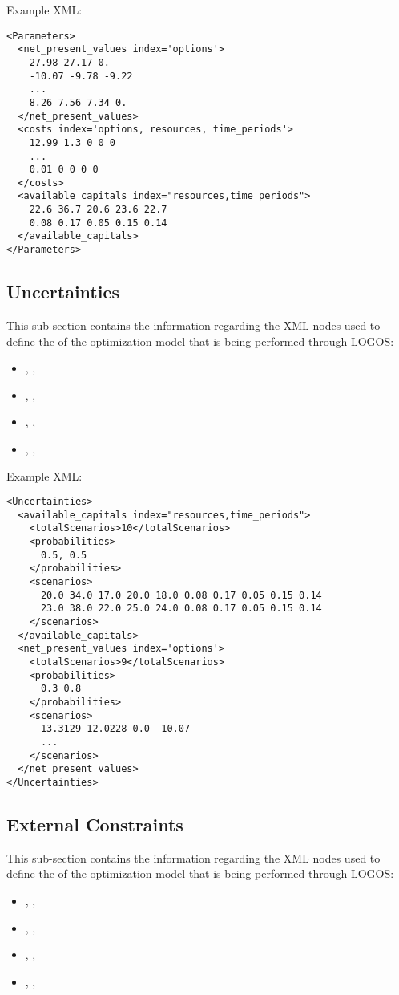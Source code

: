 Example XML:
\begin{lstlisting}[style=XML]
<Parameters>
  <net_present_values index='options'>
    27.98 27.17 0.
    -10.07 -9.78 -9.22
    ...
    8.26 7.56 7.34 0.
  </net_present_values>
  <costs index='options, resources, time_periods'>
    12.99 1.3 0 0 0
    ...
    0.01 0 0 0 0
  </costs>
  <available_capitals index="resources,time_periods">
    22.6 36.7 20.6 23.6 22.7
    0.08 0.17 0.05 0.15 0.14
  </available_capitals>
</Parameters>
\end{lstlisting}


%
\subsection{Uncertainties}
\label{subsec:Uncertainties}
This sub-section contains the information regarding the XML nodes used to define the
 of the optimization model that is being performed through LOGOS:
\begin{itemize}
  \item \xmlNode{}, \xmlDesc{},
  \item \xmlNode{}, \xmlDesc{},
  \item \xmlNode{}, \xmlDesc{},
  \item \xmlNode{}, \xmlDesc{},
\end{itemize}

Example XML:
\begin{lstlisting}[style=XML]
<Uncertainties>
  <available_capitals index="resources,time_periods">
    <totalScenarios>10</totalScenarios>
    <probabilities>
      0.5, 0.5
    </probabilities>
    <scenarios>
      20.0 34.0 17.0 20.0 18.0 0.08 0.17 0.05 0.15 0.14
      23.0 38.0 22.0 25.0 24.0 0.08 0.17 0.05 0.15 0.14
    </scenarios>
  </available_capitals>
  <net_present_values index='options'>
    <totalScenarios>9</totalScenarios>
    <probabilities>
      0.3 0.8
    </probabilities>
    <scenarios>
      13.3129 12.0228 0.0 -10.07
      ...
    </scenarios>
  </net_present_values>
</Uncertainties>
\end{lstlisting}



%
\subsection{External Constraints}
\label{subsec:ExternalConstraints}
This sub-section contains the information regarding the XML nodes used to define the
 of the optimization model that is being performed through LOGOS:
\begin{itemize}
  \item \xmlNode{}, \xmlDesc{},
  \item \xmlNode{}, \xmlDesc{},
  \item \xmlNode{}, \xmlDesc{},
  \item \xmlNode{}, \xmlDesc{},
\end{itemize}

